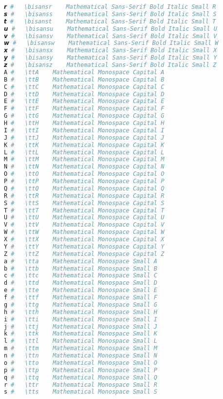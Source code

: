 \begin{lstlisting}[language=Julia, style=julia]
𝙧 #   \bisansr    Mathematical Sans-Serif Bold Italic Small R
𝙨 #   \bisanss    Mathematical Sans-Serif Bold Italic Small S
𝙩 #   \bisanst    Mathematical Sans-Serif Bold Italic Small T
𝙪 #   \bisansu    Mathematical Sans-Serif Bold Italic Small U
𝙫 #   \bisansv    Mathematical Sans-Serif Bold Italic Small V
𝙬 #   \bisansw    Mathematical Sans-Serif Bold Italic Small W
𝙭 #   \bisansx    Mathematical Sans-Serif Bold Italic Small X
𝙮 #   \bisansy    Mathematical Sans-Serif Bold Italic Small Y
𝙯 #   \bisansz    Mathematical Sans-Serif Bold Italic Small Z
𝙰 #   \ttA    Mathematical Monospace Capital A
𝙱 #   \ttB    Mathematical Monospace Capital B
𝙲 #   \ttC    Mathematical Monospace Capital C
𝙳 #   \ttD    Mathematical Monospace Capital D
𝙴 #   \ttE    Mathematical Monospace Capital E
𝙵 #   \ttF    Mathematical Monospace Capital F
𝙶 #   \ttG    Mathematical Monospace Capital G
𝙷 #   \ttH    Mathematical Monospace Capital H
𝙸 #   \ttI    Mathematical Monospace Capital I
𝙹 #   \ttJ    Mathematical Monospace Capital J
𝙺 #   \ttK    Mathematical Monospace Capital K
𝙻 #   \ttL    Mathematical Monospace Capital L
𝙼 #   \ttM    Mathematical Monospace Capital M
𝙽 #   \ttN    Mathematical Monospace Capital N
𝙾 #   \ttO    Mathematical Monospace Capital O
𝙿 #   \ttP    Mathematical Monospace Capital P
𝚀 #   \ttQ    Mathematical Monospace Capital Q
𝚁 #   \ttR    Mathematical Monospace Capital R
𝚂 #   \ttS    Mathematical Monospace Capital S
𝚃 #   \ttT    Mathematical Monospace Capital T
𝚄 #   \ttU    Mathematical Monospace Capital U
𝚅 #   \ttV    Mathematical Monospace Capital V
𝚆 #   \ttW    Mathematical Monospace Capital W
𝚇 #   \ttX    Mathematical Monospace Capital X
𝚈 #   \ttY    Mathematical Monospace Capital Y
𝚉 #   \ttZ    Mathematical Monospace Capital Z
𝚊 #   \tta    Mathematical Monospace Small A
𝚋 #   \ttb    Mathematical Monospace Small B
𝚌 #   \ttc    Mathematical Monospace Small C
𝚍 #   \ttd    Mathematical Monospace Small D
𝚎 #   \tte    Mathematical Monospace Small E
𝚏 #   \ttf    Mathematical Monospace Small F
𝚐 #   \ttg    Mathematical Monospace Small G
𝚑 #   \tth    Mathematical Monospace Small H
𝚒 #   \tti    Mathematical Monospace Small I
𝚓 #   \ttj    Mathematical Monospace Small J
𝚔 #   \ttk    Mathematical Monospace Small K
𝚕 #   \ttl    Mathematical Monospace Small L
𝚖 #   \ttm    Mathematical Monospace Small M
𝚗 #   \ttn    Mathematical Monospace Small N
𝚘 #   \tto    Mathematical Monospace Small O
𝚙 #   \ttp    Mathematical Monospace Small P
𝚚 #   \ttq    Mathematical Monospace Small Q
𝚛 #   \ttr    Mathematical Monospace Small R
𝚜 #   \tts    Mathematical Monospace Small S

\end{lstlisting}
